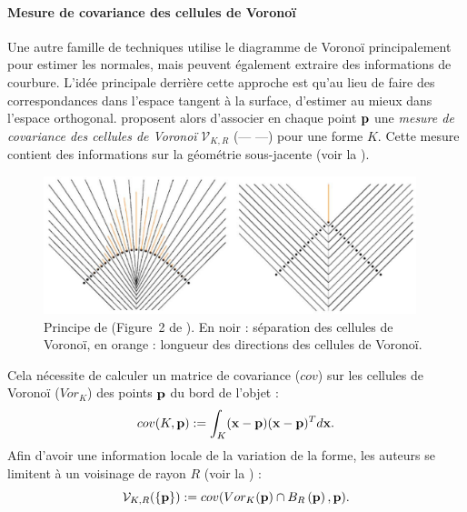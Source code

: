 \paragraph{Mesure de covariance des cellules de Voronoï}
%
Une autre famille de techniques utilise le diagramme de Voronoï
\cite{Alliez2007,Merigot2009,Merigot2011,Cuel2014DGCI} principalement pour
estimer les normales, mais peuvent également extraire des informations de
courbure. L'idée principale derrière cette approche est qu'au lieu de faire des
correspondances dans l'espace tangent à la surface, d'estimer au mieux dans
l'espace orthogonal.  proposent alors d'associer
en chaque point $\mathbf{p}$ une \emph{mesure de covariance des cellules de Voronoï}
$\mathcal{V}_{K,R}$ (\VCMM --- \VCM ---) pour une forme $K$. Cette mesure
contient des informations sur la géométrie sous-jacente (voir la
).
%

\begin{figure}[ht]{
    \begin{center}
    \includegraphics[height=4cm]{images/Feature/VCM}
    \end{center}}
    \caption[Principe de \VCM.]{Principe de \VCM (Figure~2 de \cite{Merigot2011}). En noir : séparation des cellules de Voronoï, en orange : longueur des directions des cellules de Voronoï.
      \label{fig:merigot-VCM-c}}
\end{figure}

Cela nécessite de calculer un matrice de covariance ($cov$) sur les cellules de
Voronoï ($Vor_K$) des points $\mathbf{p}$ du bord de l'objet :
%
\begin{equation}
    cov(K,\mathbf{p}) := \int_K (\mathbf{x} - \mathbf{p})(\mathbf{x} - \mathbf{p})^T d\mathbf{x} .
\end{equation}
%
Afin d'avoir une information locale de la variation de la forme, les auteurs se
limitent à un voisinage de rayon $R$ (voir la ) :
%
\begin{equation}
  \mathcal{V}_{K,R}(\{\mathbf{p}\}) := cov(Vor_K(\mathbf{p}) \cap B_{R}\left(\mathbf{p}\right), \mathbf{p}) .
\end{equation}

